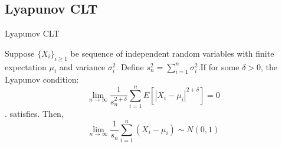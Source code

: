 \documentclass{beamer}
\numberwithin{theorem}{section}
\theoremstyle{definition}
\begin{document}
       \subsection{Lyapunov CLT}
       \begin{frame}{Lyapunov CLT}
       \begin{theorem}
           Suppose $\{X_i\}_{i\ge 1}$ be sequence of independent random variables with finite expectation $\mu_i$ and variance $\sigma^2_i$. Define $s_n^2=\sum_{i=1}^n\sigma^2_i$.If for some $\delta>0$, the Lyapunov condition:
           $$\lim_{n\rightarrow\infty}\frac{1}{s_n^{2+\delta}}\sum_{i=1}^nE[|X_i-\mu_i|^{2+\delta}]=0$$.
           satisfies. Then,
           $$\lim_{n\rightarrow\infty}\frac{1}{s_n}\sum_{i=1}^n(X_i-\mu_i)\sim N(0,1)$$
           \end{theorem}
           
       \end{frame}
\end{document}
